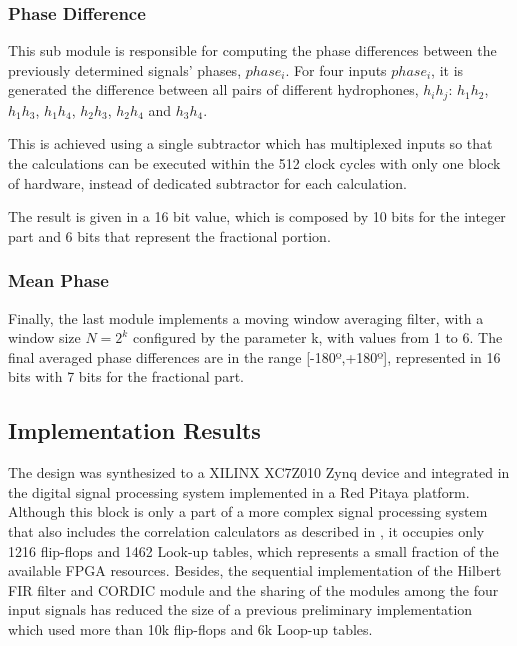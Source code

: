 \subsubsection{Phase Difference}

This sub module is responsible for computing the phase differences between the previously determined signals' phases, $phase_i$. For four inputs $phase_i$, it is generated the difference between all pairs of different hydrophones, $h_ih_j$: $h_1h_2$, $h_1h_3$, $h_1h_4$, $h_2h_3$, $h_2h_4$ and $h_3h_4$.

This is achieved using a single subtractor which has multiplexed inputs so that the calculations can be executed within the 512 clock cycles with only one block of hardware, instead of dedicated subtractor for each calculation. 

The result is given in a 16 bit value, which is composed by 10 bits for the integer part and 6 bits that represent the fractional portion. 

\subsubsection{Mean Phase}

Finally, the last module implements a moving window averaging filter, with a window size $N = 2^k$ configured by the parameter k, with values from 1 to 6. The final averaged phase differences are in the range [-180º,+180º], represented in 16 bits with 7 bits for the fractional part.

\subsection{Implementation Results}

The design was synthesized to a XILINX XC7Z010 Zynq \cite{xilinx-board} device and integrated in the digital signal processing system implemented in a Red Pitaya platform. Although this block is only a part of a more complex signal processing system that also includes the correlation calculators as described in \cite{afonso-thesis}, it occupies only 1216 flip-flops and 1462 Look-up tables, which represents a small fraction of the available FPGA resources. Besides, the sequential implementation of the Hilbert FIR filter and CORDIC module and the sharing of the modules among the four input signals has reduced the size of a previous preliminary implementation which used more than 10k flip-flops and 6k Loop-up tables.


